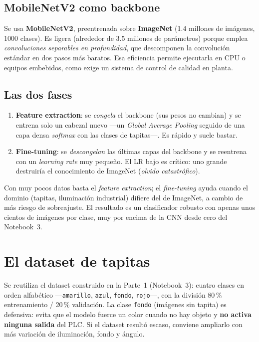 \subsection{MobileNetV2 como backbone}

Se usa \textbf{MobileNetV2}, preentrenada sobre \textbf{ImageNet} (1.4 millones de imágenes,
1000 clases). Es ligera (alrededor de 3.5 millones de parámetros) porque emplea
\emph{convoluciones separables en profundidad}, que descomponen la convolución estándar en
dos pasos más baratos. Esa eficiencia permite ejecutarla en CPU o equipos embebidos, como
exige un sistema de control de calidad en planta.

\subsection{Las dos fases}

\begin{enumerate}
  \item \textbf{Feature extraction}: se \emph{congela} el backbone (sus pesos no cambian) y
        se entrena solo un cabezal nuevo ---un \emph{Global Average Pooling} seguido de una
        capa densa \emph{softmax} con las clases de tapitas---. Es rápido y suele bastar.
  \item \textbf{Fine-tuning}: se \emph{descongelan} las últimas capas del backbone y se
        reentrena con un \emph{learning rate} muy pequeño. El LR bajo es crítico: uno grande
        destruiría el conocimiento de ImageNet (\emph{olvido catastrófico}).
\end{enumerate}

Con muy pocos datos basta el \emph{feature extraction}; el \emph{fine-tuning} ayuda cuando el
dominio (tapitas, iluminación industrial) difiere del de ImageNet, a cambio de más riesgo de
sobreajuste. El resultado es un clasificador robusto con apenas unos cientos de imágenes por
clase, muy por encima de la CNN desde cero del Notebook~3.

\section{El dataset de tapitas}

Se reutiliza el dataset construido en la Parte~1 (Notebook~3): cuatro clases en orden
alfabético ---\texttt{amarillo}, \texttt{azul}, \texttt{fondo}, \texttt{rojo}---, con la
división 80\,\% entrenamiento / 20\,\% validación. La clase \texttt{fondo} (imágenes sin
tapita) es defensiva: evita que el modelo fuerce un color cuando no hay objeto y
\textbf{no activa ninguna salida} del PLC. Si el dataset resultó escaso, conviene ampliarlo
con más variación de iluminación, fondo y ángulo.

